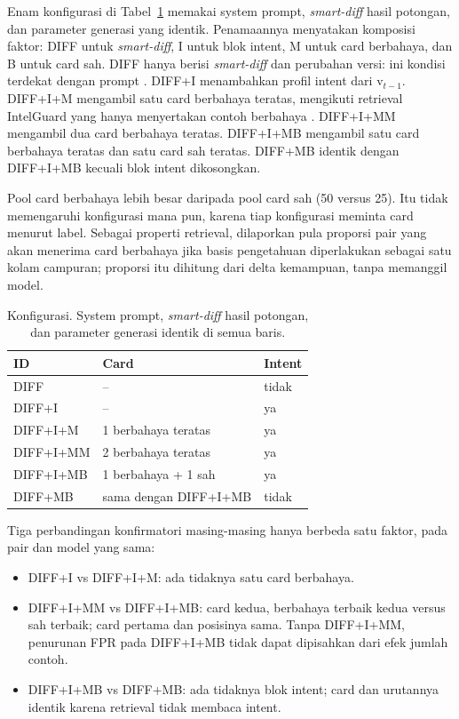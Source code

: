 \documentclass[a4paper,fleqn]{cas-dc}
\begin{document}
Enam konfigurasi di Tabel~\ref{tab:configs} memakai system prompt,
\emph{smart-diff} hasil potongan, dan parameter generasi yang identik.
Penamaannya menyatakan komposisi faktor: DIFF untuk \emph{smart-diff}, I untuk
blok intent, M untuk card berbahaya, dan B untuk card sah. DIFF hanya berisi
\emph{smart-diff} dan perubahan versi: ini kondisi terdekat dengan prompt
\citet{wyss2025evaluating}. DIFF+I menambahkan profil intent dari
$\mathrm{v}_{t-1}$. DIFF+I+M mengambil satu card berbahaya teratas, mengikuti
retrieval IntelGuard yang hanya menyertakan contoh berbahaya
\citep{guo2026bridging}. DIFF+I+MM mengambil dua card berbahaya teratas.
DIFF+I+MB mengambil satu card berbahaya teratas dan satu card sah teratas.
DIFF+MB identik dengan DIFF+I+MB kecuali blok intent dikosongkan.

Pool card berbahaya lebih besar daripada pool card sah (50 versus 25). Itu tidak
memengaruhi konfigurasi mana pun, karena tiap konfigurasi meminta card menurut
label. Sebagai properti retrieval, dilaporkan pula proporsi pair yang akan
menerima card berbahaya jika basis pengetahuan diperlakukan sebagai satu kolam
campuran; proporsi itu dihitung dari delta kemampuan, tanpa memanggil model.

\begin{table}[t]
\caption{Konfigurasi. System prompt, \emph{smart-diff} hasil potongan, dan
parameter generasi identik di semua baris.}
\label{tab:configs}
\small
\begin{tabular}{lll}
\hline
ID & Card & Intent \\
\hline
DIFF & -- & tidak \\
DIFF+I & -- & ya \\
DIFF+I+M & 1 berbahaya teratas & ya \\
DIFF+I+MM & 2 berbahaya teratas & ya \\
DIFF+I+MB & 1 berbahaya + 1 sah & ya \\
DIFF+MB & sama dengan DIFF+I+MB & tidak \\
\hline
\end{tabular}
\end{table}

Tiga perbandingan konfirmatori masing-masing hanya berbeda satu faktor, pada
pair dan model yang sama:

\begin{itemize}
\item DIFF+I vs DIFF+I+M: ada tidaknya satu card berbahaya.
\item DIFF+I+MM vs DIFF+I+MB: card kedua, berbahaya terbaik kedua versus sah
terbaik; card pertama dan posisinya sama. Tanpa DIFF+I+MM, penurunan FPR pada
DIFF+I+MB tidak dapat dipisahkan dari efek jumlah contoh.
\item DIFF+I+MB vs DIFF+MB: ada tidaknya blok intent; card dan urutannya
identik karena retrieval tidak membaca intent.
\end{itemize}
\end{document}
